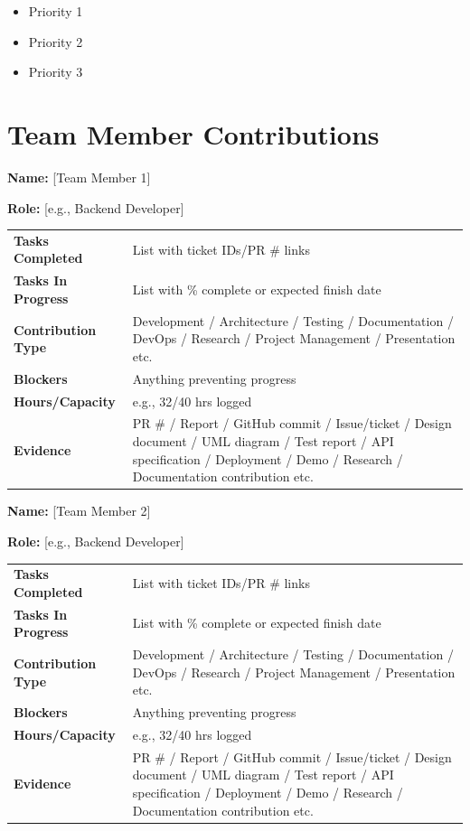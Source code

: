 \documentclass[11pt,a4paper]{article}
\newcommand{\field}[2]{\textbf{#1:} #2\par}
\begin{document}
\begin{itemize}
    \item Priority 1
    \item Priority 2
    \item Priority 3
\end{itemize}

\section{Team Member Contributions}

\vspace{10pt}

\hspace{0.58cm}\field{Name}{[Team Member 1]}
\field{Role}{[e.g., Backend Developer]}

\vspace{4pt}

\begin{tabular}{>{\bfseries}p{} p{}}
\toprule
Tasks Completed & List with ticket IDs/PR \# links \\
Tasks In Progress & List with \% complete or expected finish date \\
Contribution Type & Development / Architecture / Testing / Documentation / DevOps / Research / Project Management / Presentation etc.\\
Blockers & Anything preventing progress \\
Hours/Capacity & e.g., 32/40 hrs logged \\
Evidence & PR \# / Report / GitHub commit / Issue/ticket / Design document / UML diagram / Test report / API specification / Deployment / Demo / Research / Documentation contribution etc.\\
\bottomrule
\end{tabular}

\vspace{10pt}

\field{Name}{[Team Member 2]}
\field{Role}{[e.g., Backend Developer]}

\vspace{4pt}

\begin{tabular}{>{\bfseries}p{} p{}}
\toprule
Tasks Completed & List with ticket IDs/PR \# links \\
Tasks In Progress & List with \% complete or expected finish date \\
Contribution Type & Development / Architecture / Testing / Documentation / DevOps / Research / Project Management / Presentation etc.\\
Blockers & Anything preventing progress \\
Hours/Capacity & e.g., 32/40 hrs logged \\
Evidence & PR \# / Report / GitHub commit / Issue/ticket / Design document / UML diagram / Test report / API specification / Deployment / Demo / Research / Documentation contribution etc.\\
\bottomrule
\end{tabular}
\end{document}
